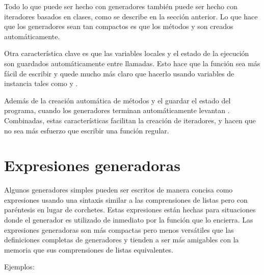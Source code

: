 \documentclass[a4,10pt,spanish]{sphinxmanual}
\begin{document}
\sphinxAtStartPar
Todo lo que puede ser hecho con generadores también puede ser hecho con iteradores basados en clases, como se describe en la sección anterior.  Lo que hace que los generadores sean tan compactos es que los métodos  y  son creados automáticamente.

\sphinxAtStartPar
Otra característica clave es que las variables locales y el estado de la ejecución son guardados automáticamente entre llamadas.  Esto hace que la función sea más fácil de escribir y quede mucho más claro que hacerlo usando variables de instancia tales como  y .

\sphinxAtStartPar
Además de la creación automática de métodos y el guardar el estado del programa, cuando los generadores terminan automáticamente levantan .  Combinadas, estas características facilitan la creación de iteradores, y hacen que no sea más esfuerzo que escribir una función regular.


\section{Expresiones generadoras}
\label{\detokenize{tutorial/classes:generator-expressions}}\label{\detokenize{tutorial/classes:tut-genexps}}
\sphinxAtStartPar
Algunos generadores simples pueden ser escritos de manera concisa como expresiones usando una sintaxis similar a las comprensiones de listas pero con paréntesis en lugar de corchetes. Estas expresiones están hechas para situaciones donde el generador es utilizado de inmediato por la función que lo encierra. Las expresiones generadoras son más compactas pero menos versátiles que las definiciones completas de generadores y tienden a ser más amigables con la memoria que sus comprensiones de listas equivalentes.

\sphinxAtStartPar
Ejemplos:
\end{document}
